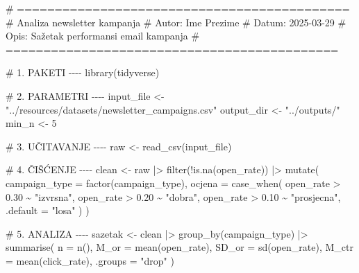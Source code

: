 \documentclass[
  croatian,
  letterpaper,
  DIV=11,
  numbers=noendperiod]{scrartcl}
\newenvironment{Shaded}{\begin{snugshade}}{\end{snugshade}}
\newcommand{\AttributeTok}[1]{\textcolor[rgb]{0.40,0.45,0.13}{#1}}
\newcommand{\CommentTok}[1]{\textcolor[rgb]{0.37,0.37,0.37}{#1}}
\newcommand{\DecValTok}[1]{\textcolor[rgb]{0.68,0.00,0.00}{#1}}
\newcommand{\FloatTok}[1]{\textcolor[rgb]{0.68,0.00,0.00}{#1}}
\newcommand{\FunctionTok}[1]{\textcolor[rgb]{0.28,0.35,0.67}{#1}}
\newcommand{\NormalTok}[1]{\textcolor[rgb]{0.00,0.23,0.31}{#1}}
\newcommand{\OtherTok}[1]{\textcolor[rgb]{0.00,0.23,0.31}{#1}}
\newcommand{\SpecialCharTok}[1]{\textcolor[rgb]{0.37,0.37,0.37}{#1}}
\newcommand{\StringTok}[1]{\textcolor[rgb]{0.13,0.47,0.30}{#1}}
\begin{document}
\begin{Shaded}
\begin{Highlighting}[]
\CommentTok{\# ============================================}
\CommentTok{\# Analiza newsletter kampanja}
\CommentTok{\# Autor: Ime Prezime}
\CommentTok{\# Datum: 2025{-}03{-}29}
\CommentTok{\# Opis: Sažetak performansi email kampanja}
\CommentTok{\# ============================================}

\CommentTok{\# 1. PAKETI {-}{-}{-}{-}}
\FunctionTok{library}\NormalTok{(tidyverse)}

\CommentTok{\# 2. PARAMETRI {-}{-}{-}{-}}
\NormalTok{input\_file }\OtherTok{\textless{}{-}} \StringTok{"../resources/datasets/newsletter\_campaigns.csv"}
\NormalTok{output\_dir }\OtherTok{\textless{}{-}} \StringTok{"../outputs/"}
\NormalTok{min\_n }\OtherTok{\textless{}{-}} \DecValTok{5}

\CommentTok{\# 3. UČITAVANJE {-}{-}{-}{-}}
\NormalTok{raw }\OtherTok{\textless{}{-}} \FunctionTok{read\_csv}\NormalTok{(input\_file)}

\CommentTok{\# 4. ČIŠĆENJE {-}{-}{-}{-}}
\NormalTok{clean }\OtherTok{\textless{}{-}}\NormalTok{ raw }\SpecialCharTok{|\textgreater{}}
  \FunctionTok{filter}\NormalTok{(}\SpecialCharTok{!}\FunctionTok{is.na}\NormalTok{(open\_rate)) }\SpecialCharTok{|\textgreater{}}
  \FunctionTok{mutate}\NormalTok{(}
    \AttributeTok{campaign\_type =} \FunctionTok{factor}\NormalTok{(campaign\_type),}
    \AttributeTok{ocjena =} \FunctionTok{case\_when}\NormalTok{(}
\NormalTok{      open\_rate }\SpecialCharTok{\textgreater{}} \FloatTok{0.30} \SpecialCharTok{\textasciitilde{}} \StringTok{"izvrsna"}\NormalTok{,}
\NormalTok{      open\_rate }\SpecialCharTok{\textgreater{}} \FloatTok{0.20} \SpecialCharTok{\textasciitilde{}} \StringTok{"dobra"}\NormalTok{,}
\NormalTok{      open\_rate }\SpecialCharTok{\textgreater{}} \FloatTok{0.10} \SpecialCharTok{\textasciitilde{}} \StringTok{"prosjecna"}\NormalTok{,}
      \AttributeTok{.default =} \StringTok{"losa"}
\NormalTok{    )}
\NormalTok{  )}

\CommentTok{\# 5. ANALIZA {-}{-}{-}{-}}
\NormalTok{sazetak }\OtherTok{\textless{}{-}}\NormalTok{ clean }\SpecialCharTok{|\textgreater{}}
  \FunctionTok{group\_by}\NormalTok{(campaign\_type) }\SpecialCharTok{|\textgreater{}}
  \FunctionTok{summarise}\NormalTok{(}
    \AttributeTok{n =} \FunctionTok{n}\NormalTok{(),}
    \AttributeTok{M\_or =} \FunctionTok{mean}\NormalTok{(open\_rate),}
    \AttributeTok{SD\_or =} \FunctionTok{sd}\NormalTok{(open\_rate),}
    \AttributeTok{M\_ctr =} \FunctionTok{mean}\NormalTok{(click\_rate),}
    \AttributeTok{.groups =} \StringTok{"drop"}
\NormalTok{  )}


\end{Highlighting}
\end{Shaded}
\end{document}
